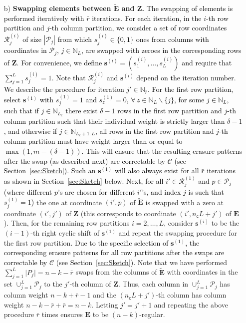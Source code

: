 \documentclass[twocolumn,conference]{IEEEtran}
\newcommand{\Nat}[1]{\mathbb{N}_{#1}}        %
\newcommand{\modify}[1]{\textcolor{black}{#1}}
\begin{document}
\begin{enumerate}
\item[b)] \textbf{Swapping elements between $\tilde{\bm E}$ and $\bm Z$.}
\modify{The swapping of elements is performed iteratively with $\bar r$ iterations. For each iteration, in the $i$-th row partition and $j$-th column partition, we consider a set of row coordinates $\mathcal R^{(i)}_j$ of size $|\mathcal{P}_j|$ from which $s_{j}^{(i)}\in\{0,1\}$ ones from columns with coordinates in $\mathcal P_j$, $j \in \Nat{L}$,  are swapped with zeroes in the corresponding rows of $\bm Z$. For convenience, we define $\bm s^{(i)}=(s_{1}^{(i)},\ldots,s_{L}^{(i)})$ and require that  $\sum_{j=1}^{L}s^{(i)}_j = 1$.  Note that  $\mathcal R^{(i)}_j$ and $\bm s^{(i)}$ depend on the iteration number. We describe the procedure for iteration $j' \in \Nat{\bar{r}}$. For the first row partition, select $\bm s^{(1)}$ with $s^{(1)}_j=1$ and $s^{(1)}_z=0$, $\forall\, z\in\Nat{L}\backslash\{j\}$, for some $j\in\Nat{L}$, such that if $j \in \Nat{L_{\mathsf c}}$ there exist $\delta-1$ rows in the first row partition and $j$-th column partition such that their individual weight is strictly larger than $\delta-1$, and otherwise if $j \in \Nat{L_{\mathsf c}+1:L}$, all rows in the first row partition and $j$-th column partition must have weight  larger than or equal to $\max(1,m-(\delta-1))$. This will ensure that the resulting erasure patterns after the swap (as described next) are correctable by $\mathcal{C}$ (see Section~\ref{sec:Sketch}). Such an $\bm s^{(1)}$ will also always exist   for all $\bar{r}$ iterations as shown in Section~\ref{sec:Sketch} below. Next, for all $i'\in\mathcal R^{(1)}_j$ and $p\in\mathcal P_j$ (where different $p$'s are chosen for different $i'$'s, and index $j$ is such that $s^{(1)}_j=1$)} the one at coordinate  $(i',p)$ of $\tilde{\bm E}$ is swapped with a zero at coordinate $(i',j')$ of $\bm Z$  (this corresponds to coordinate $(i',n_{\mathsf c}L+j')$ of $\bm E$). Then, for the remaining row partitions $i=2,\ldots,L$, consider $\bm s^{(i)}$ to be  the $(i-1)$-th right cyclic shift of $\bm s^{(1)}$ and repeat the swapping procedure for the first row partition. %
\modify{Due to the specific selection of $\bm s^{(1)}$, the corresponding erasure patterns for all row partitions after the swaps are correctable by $\mathcal{C}$ (see Section~\ref{sec:Sketch}).}
Note that we have performed  $\sum_{j=1}^{L} \mathcal |P_j|=n-k-\bar r$ swaps from the columns of $\tilde{\bm E}$ with coordinates in the set  $\cup_{j=1}^{L} \mathcal P_j$ to the $j'$-th column of $\bm Z$. Thus, each column in $\cup_{j=1}^{L} \mathcal P_j$ has column weight $n-k+\bar r-1$ and the $(n_{\mathsf c}L+j')$-th column has column weight $n-k-\bar r+\bar r=n-k$. Letting $j'=j'+1$ and repeating the above procedure $\bar r$ times ensures $\bm E$ to be $(n-k)$-regular.

\end{enumerate}
\end{document}
